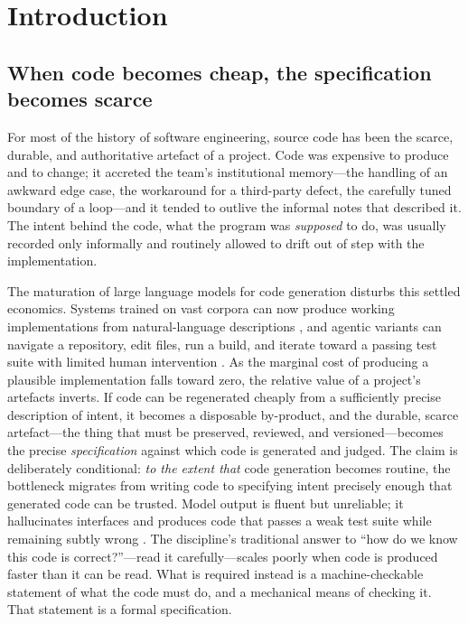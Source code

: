\chapter{Introduction}\label{ch:introduction}

\section{When code becomes cheap, the specification becomes scarce}

For most of the history of software engineering, source code has been the scarce,
durable, and authoritative artefact of a project. Code was expensive to produce
and to change; it accreted the team's institutional memory---the handling of an
awkward edge case, the workaround for a third-party defect, the carefully tuned
boundary of a loop---and it tended to outlive the informal notes that described
it. The intent behind the code, what the program was \emph{supposed} to do, was
usually recorded only informally and routinely allowed to drift out of step with
the implementation.

The maturation of large language models for code generation disturbs this settled
economics. Systems trained on vast corpora can now produce working implementations
from natural-language descriptions \citep{chen2021codex,li2022alphacode}, and
agentic variants can navigate a repository, edit files, run a build, and iterate
toward a passing test suite with limited human intervention
\citep{yang2024sweagent,jimenez2024swebench}. As the marginal cost of producing a
plausible implementation falls toward zero, the relative value of a project's
artefacts inverts. If code can be regenerated cheaply from a sufficiently precise
description of intent, it becomes a disposable by-product, and the durable, scarce
artefact---the thing that must be preserved, reviewed, and versioned---becomes the
precise \emph{specification} against which code is generated and judged. The claim
is deliberately conditional: \emph{to the extent that} code generation becomes
routine, the bottleneck migrates from writing code to specifying intent precisely
enough that generated code can be trusted. Model output is fluent but unreliable;
it hallucinates interfaces and produces code that passes a weak test suite while
remaining subtly wrong \citep{zhang2025hallucination,liu2023evalplus}. The
discipline's traditional answer to ``how do we know this code is correct?''---read
it carefully---scales poorly when code is produced faster than it can be read. What
is required instead is a machine-checkable statement of what the code must do, and
a mechanical means of checking it. That statement is a formal specification.

